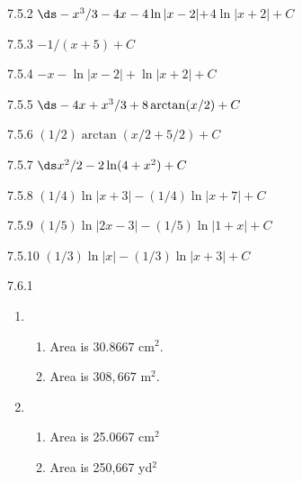 \begin{Answer}{7.5.2}
 $\ds -x^3/3-4x-4\ln|x-2|+$\hfill\break$4\ln|x+2| +C$
\end{Answer}
\begin{Answer}{7.5.3}
 $-1/(x+5) +C$
\end{Answer}
\begin{Answer}{7.5.4}
 $-x-\ln|x-2|+\ln|x+2| +C$
\end{Answer}
\begin{Answer}{7.5.5}
 $\ds -4x+x^3/3+8\arctan(x/2) +C$
\end{Answer}
\begin{Answer}{7.5.6}
 $(1/2)\arctan(x/2+5/2) +C$
\end{Answer}
\begin{Answer}{7.5.7}
 $\ds x^2/2-2\ln(4+x^2) +C$
\end{Answer}
\begin{Answer}{7.5.8}
 $(1/4)\ln|x+3|-(1/4)\ln|x+7| +C$
\end{Answer}
\begin{Answer}{7.5.9}
 $(1/5)\ln|2x-3|-(1/5)\ln|1+x| +C$
\end{Answer}
\begin{Answer}{7.5.10}
 $(1/3)\ln|x|-(1/3)\ln|x+3| +C$
\end{Answer}
\begin{Answer}{7.6.1}
\begin{enumerate}
\item {\begin{enumerate}
\item		Area is $30.8667$ cm$^2$.
\item		Area is $308,667$ m$^2$.
\end{enumerate}
}

\item {\begin{enumerate}
\item		Area is 25.0667 cm$^2$
\item		Area is 250,667 yd$^2$
\end{enumerate}
}

\end{enumerate}
\end{Answer}
